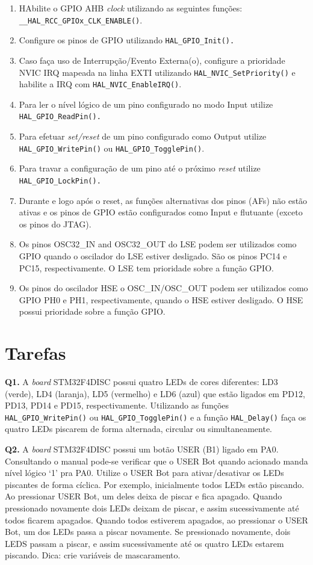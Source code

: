 \documentclass[12pt,journal,compsoc]{IEEEtran}
\begin{document}
\begin{enumerate}
    \item HAbilite o GPIO AHB \emph{clock} utilizando as seguintes funções:
\texttt{\_\_HAL\_RCC\_GPIOx\_CLK\_ENABLE()}.
    \item Configure os pinos de GPIO utilizando \texttt{HAL\_GPIO\_Init().}
    \item Caso faça uso de Interrupção/Evento Externa(o), configure a prioridade NVIC IRQ
mapeada na linha EXTI utilizando \texttt{HAL\_NVIC\_SetPriority()} e habilite a IRQ com \texttt{HAL\_NVIC\_EnableIRQ()}.
    \item Para ler o nível lógico de um pino configurado no modo Input utilize \texttt{HAL\_GPIO\_ReadPin().}
    \item Para efetuar \emph{set/reset} de um pino configurado como Output utilize \texttt{HAL\_GPIO\_WritePin()} ou \texttt{HAL\_GPIO\_TogglePin()}.
    \item Para travar a configuração de um pino até o próximo \emph{reset} utilize \texttt{HAL\_GPIO\_LockPin().}
    \item Durante e logo após o reset, as funções alternativas dos pinos (AFs) não estão ativas e os pinos de GPIO estão configurados como Input e flutuante (exceto os pinos do JTAG).
    \item Os pinos OSC32\_IN and OSC32\_OUT do LSE podem ser utilizados como GPIO quando o oscilador do LSE estiver desligado. São os pinos PC14 e PC15, respectivamente. O LSE tem prioridade sobre a função GPIO.
    \item Os pinos do oscilador HSE o OSC\_IN/OSC\_OUT podem ser utilizados como GPIO PH0 e PH1, respectivamente, quando o HSE estiver desligado. O HSE possui prioridade sobre a função GPIO.
\end{enumerate}

\section{Tarefas}

\noindent\textbf{Q1.} A \emph{board} STM32F4DISC possui quatro LEDs de cores diferentes: LD3 (verde), LD4 (laranja), LD5 (vermelho) e LD6 (azul) que estão ligados em PD12, PD13, PD14 e PD15, respectivamente. Utilizando as funções \texttt{HAL\_GPIO\_WritePin()} ou \texttt{HAL\_GPIO\_TogglePin()} e a função \texttt{HAL\_Delay()} faça os quatro LEDs piscarem de forma alternada, circular ou simultaneamente. 

\noindent\textbf{Q2.} A \emph{board} STM32F4DISC possui um botão USER (B1) ligado em PA0. Consultando o manual pode-se verificar que o USER Bot quando acionado manda nível lógico `1' pra PA0. Utilize o USER Bot para ativar/desativar os LEDs piscantes de forma cíclica. Por exemplo, inicialmente todos LEDs estão piscando. Ao pressionar USER Bot, um deles deixa de piscar e fica apagado. Quando pressionado novamente dois LEDs deixam de piscar, e assim sucessivamente até todos ficarem apagados. Quando todos estiverem apagados, ao pressionar o USER Bot, um dos LEDs passa a piscar novamente. Se pressionado novamente, dois LEDS passam a piscar, e assim sucessivamente até os quatro LEDs estarem piscando. Dica: crie variáveis de mascaramento.
\end{document}
